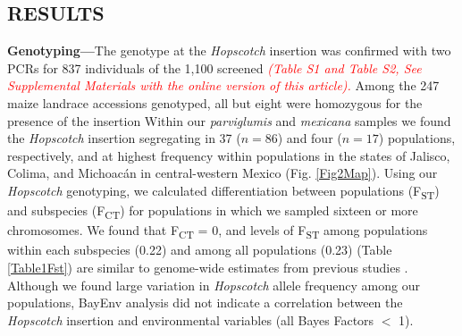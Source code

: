 \documentclass[11pt]{article} %
\newcommand{\track}[1]{\textcolor{red}{\emph{\normalsize #1}} }
\begin{document}
\begin{linenumbers}
\begin{flushleft}
\begin{centering}
\section*{RESULTS}
\end{centering}

\textbf{Genotyping---}The genotype at the \emph{Hopscotch} insertion was confirmed with two PCRs for 837 individuals of the 1,100 screened \track{(Table S1 and Table S2, See Supplemental Materials with the online version of this article).}Among the 247 maize landrace accessions genotyped, all but eight were homozygous for the presence of the insertion Within our \emph{parviglumis} and \emph{mexicana} samples we found the \emph{Hopscotch} insertion segregating in 37 ($n=86$) and four ($n=17$) populations, respectively, and at highest frequency within populations in the states of Jalisco, Colima, and Michoac\'{a}n in central-western Mexico (Fig. \ref{Fig2Map}). Using our \emph{Hopscotch} genotyping, we calculated differentiation between populations (F\textsubscript{ST}) and subspecies (F\textsubscript{CT}) for populations in which we sampled sixteen or more chromosomes. We found that F\textsubscript{CT} = 0, and levels of F\textsubscript{ST} among populations within each subspecies (0.22) and among all populations (0.23) (Table \ref{Table1Fst}) are similar to genome-wide estimates from previous studies \citealt{Pyhajarvi2013}. Although we found large variation in \emph{Hopscotch} allele frequency among our populations, BayEnv analysis did not indicate a correlation between the \emph{Hopscotch} insertion and environmental variables (all Bayes Factors $<$ 1). 


\end{flushleft}
\end{linenumbers}
\end{document}
